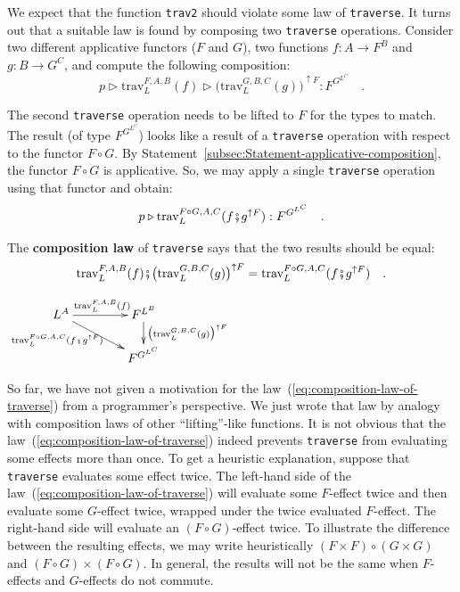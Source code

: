 We expect that the function \lstinline!trav2! should violate some
law of \lstinline!traverse!. It turns out that a suitable law is
found by composing two \lstinline!traverse! operations. Consider
two different applicative functors ($F$ and $G$), two functions
$f:A\rightarrow F^{B}$ and $g:B\rightarrow G^{C}$, and compute the
following composition:
\[
p\triangleright\text{trav}_{L}^{F,A,B}(f)\triangleright\big(\text{trav}_{L}^{G,B,C}(g)\big)^{\uparrow F}:F^{G^{L^{C}}}\quad.
\]

\noindent The second \lstinline!traverse! operation needs to be lifted
to $F$ for the types to match. The result (of type $F^{G^{L^{C}}}$)
looks like a result of a \lstinline!traverse! operation with respect
to the functor $F\circ G$. By Statement~\ref{subsec:Statement-applicative-composition},
the functor $F\circ G$ is applicative. So, we may apply a single
\lstinline!traverse! operation using that functor and obtain:
\[
p\triangleright\text{trav}_{L}^{F\circ G,A,C}(f\bef g^{\uparrow F}):F^{G^{L^{C}}}\quad.
\]

\noindent The \textbf{composition law}
of \lstinline!traverse! says that the two results should be equal:
\begin{equation}
\text{trav}_{L}^{F,A,B}(f)\bef\big(\text{trav}_{L}^{G,B,C}(g)\big)^{\uparrow F}=\text{trav}_{L}^{F\circ G,A,C}(f\bef g^{\uparrow F})\quad.\label{eq:composition-law-of-traverse}
\end{equation}

\noindent \begin{center}
$\xymatrix{\xyScaleY{1.5pc}\xyScaleX{3.4pc}L^{A}\ar[dr]\sb(0.35){\text{trav}_{L}^{F\circ G,A,C}(f\bef g^{\uparrow F})~~}\ar[r]\sp(0.5){\text{trav}_{L}^{F,A,B}(f)} & F^{L^{B}}\ar[d]\sp(0.4){\big(\text{trav}_{L}^{G,B,C}(g)\big)^{\uparrow F}}\\
 & F^{G^{L^{C}}}
}
$
\par\end{center}

So far, we have not given a motivation for the law~(\ref{eq:composition-law-of-traverse})
from a programmer\textsf{'}s perspective. We just wrote that law by analogy
with composition laws of other \textsf{``}lifting\textsf{''}-like functions. It is
not obvious that the law~(\ref{eq:composition-law-of-traverse})
indeed prevents \lstinline!traverse! from evaluating some effects
more than once. To get a heuristic explanation, suppose that \lstinline!traverse!
evaluates some effect twice. The left-hand side of the law~(\ref{eq:composition-law-of-traverse})
will evaluate some $F$-effect twice and then evaluate some $G$-effect
twice, wrapped under the twice evaluated $F$-effect. The right-hand
side will evaluate an $(F\circ G)$-effect twice. To illustrate the
difference between the resulting effects, we may write heuristically
$(F\times F)\circ(G\times G)$ and $(F\circ G)\times(F\circ G)$.
In general, the results will not be the same when $F$-effects and
$G$-effects do not commute.

